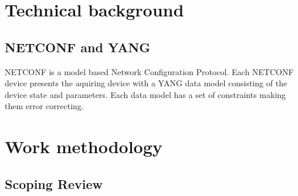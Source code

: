 \documentclass[12pt]{article}
\begin{document}
\section{Technical background}

\subsection{NETCONF and YANG}
NETCONF \cite{ennsNetworkConfigurationProtocol2011} is a model based Network Configuration Protocol.
Each NETCONF device presents the aquiring device with a YANG \cite{bjorklundYANG11Data2016} data model
consisting of the device state and parameters. 
Each data model has a set of constraints making them error correcting.

\section{Work methodology}

\subsection{Scoping Review}
\end{document}
